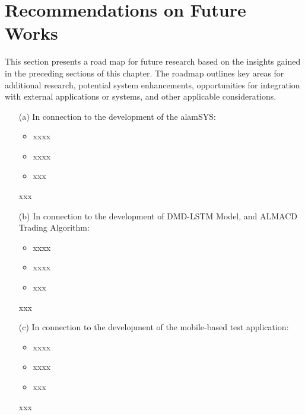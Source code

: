 \section{Recommendations on Future Works}
\label{sec:recommendations}
This section presents a road map for future research based 
on the insights gained in the preceding sections of this chapter. 
The roadmap outlines key areas for additional research, potential 
system enhancements, opportunities for integration with external 
applications or systems, and other applicable considerations.

\begin{itemize}
    \item[(a)] In connection to the development of the alamSYS:
        \begin{itemize}
            \item xxxx
            \item xxxx
            \item xxx
        \end{itemize}
        xxx
        \hfill \\
        
    \item[(b)] In connection to the development of DMD-LSTM Model, and ALMACD Trading Algorithm:
        \begin{itemize}
            \item xxxx
            \item xxxx
            \item xxx
        \end{itemize}
        xxx
        \hfill \\
        
    \item[(c)] In connection to the development of the mobile-based test application:
        \begin{itemize}
            \item xxxx
            \item xxxx
            \item xxx
        \end{itemize}
        xxx
        \hfill \\
        
\end{itemize}